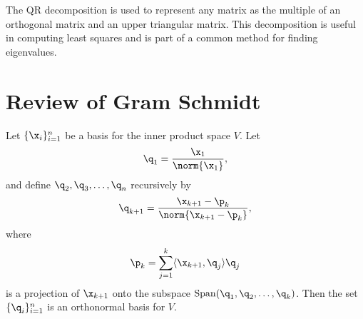 

The QR decomposition is used to represent any matrix as the multiple of an orthogonal matrix and an upper triangular matrix. This decomposition is useful in computing least squares and is part of a common method for finding eigenvalues.

\section*{Review of Gram Schmidt}

\vspace{5mm}
\begin{theorem} Let
$\{\x_i\}_{i=1}^n$ be a basis for the inner product space $V$. Let
\[
\q_1 = \frac{\x_1}{\norm{\x_1}},
\]
and define $\q_2,\q_3,\ldots,\q_n$ recursively by
\[
\q_{k+1} = \frac{\x_{k+1} - \p_k}{\norm{\x_{k+1} - \p_k}},
\]
where
\[
\p_k = \sum^k_{j=1} \langle \x_{k+1}, \q_j\rangle \q_j
\]
is a projection of $\x_{k+1}$ onto the subspace $\mbox{Span}(\q_1,\q_2,\ldots,\q_k)$.  Then the set $\{\q_i\}_{i=1}^n$ is an orthonormal basis for $V$.
\end{theorem}
\vspace{5mm}

